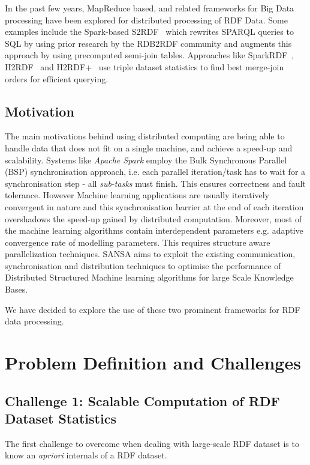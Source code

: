 In the past few years, MapReduce based, and related frameworks for Big Data processing have been explored for distributed processing of \gls{RDF} Data. 
Some examples include the Spark-based S2RDF~\cite{Schatzle:2016:SRQ:2977797.2977806} which rewrites SPARQL queries to SQL by using prior research by the RDB2RDF community and augments this approach by using precomputed semi-join tables. Approaches like SparkRDF~\cite{xu2015sparkrdf}, H2RDF~\cite{papailiou2013h} and H2RDF+~\cite{papailiou2012h2rdf} use triple dataset statistics to find best merge-join orders for efficient querying.


\subsection{Motivation}
\label{sec:motivation}

The main motivations behind using distributed computing are being able to handle data that does not fit on a single machine, and achieve a speed-up and scalability.
Systems like \textit{Apache Spark} employ the Bulk Synchronous Parallel (BSP) synchronisation approach, i.e. each parallel iteration/task has to wait for a synchronisation step - all \textit{sub-tasks} must finish. 
This ensures correctness and fault tolerance.
However Machine learning applications are usually iteratively convergent in nature and this synchronisation barrier at the end of each iteration overshadows the speed-up gained by distributed computation. 
Moreover, most of the machine learning algorithms contain interdependent parameters e.g. adaptive convergence rate of modelling parameters. 
This requires structure aware parallelization techniques. 
SANSA aims to exploit the existing communication, synchronisation and distribution techniques to optimise the performance of Distributed Structured Machine learning algorithms for large Scale Knowledge Bases.

We have decided to explore the use of these two prominent frameworks for RDF data processing.

\section{Problem Definition and Challenges}
\label{sec:problem-definition-and-challenges}

\subsection{Challenge 1: Scalable Computation of RDF Dataset Statistics}
The first challenge to overcome when dealing with large-scale RDF dataset is to know an \textit{apriori} internals of a RDF dataset.

